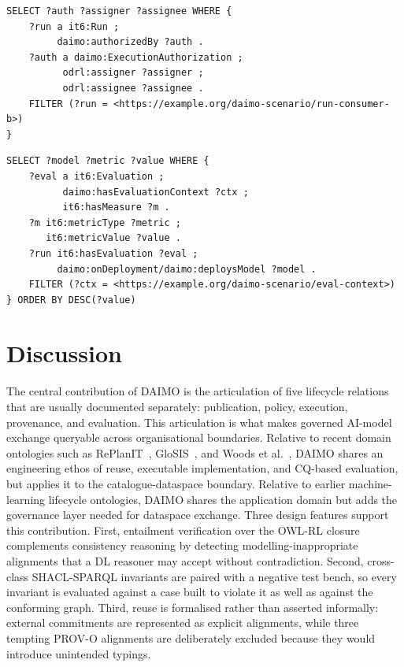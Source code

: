 \documentclass[11pt,a4paper]{article}
\begin{document}
\begin{lstlisting}[label=lst:cq-g3,caption={CQ-G3: authorisation and agreement for a specific run.}]
SELECT ?auth ?assigner ?assignee WHERE {
    ?run a it6:Run ;
         daimo:authorizedBy ?auth .
    ?auth a daimo:ExecutionAuthorization ;
          odrl:assigner ?assigner ;
          odrl:assignee ?assignee .
    FILTER (?run = <https://example.org/daimo-scenario/run-consumer-b>)
}
\end{lstlisting}

\begin{lstlisting}[label=lst:cq-v3,caption={CQ-V3: ranking of models under a shared evaluation context.}]
SELECT ?model ?metric ?value WHERE {
    ?eval a it6:Evaluation ;
          daimo:hasEvaluationContext ?ctx ;
          it6:hasMeasure ?m .
    ?m it6:metricType ?metric ;
       it6:metricValue ?value .
    ?run it6:hasEvaluation ?eval ;
         daimo:onDeployment/daimo:deploysModel ?model .
    FILTER (?ctx = <https://example.org/daimo-scenario/eval-context>)
} ORDER BY DESC(?value)
\end{lstlisting}


\section{Discussion}\label{sec:discussion}

The central contribution of DAIMO is the articulation of five lifecycle relations that are usually documented separately: publication, policy, execution, provenance, and evaluation. This articulation is what makes governed AI-model exchange queryable across organisational boundaries. Relative to recent domain ontologies such as RePlanIT~\cite{kurteva}, GloSIS~\cite{palma}, and Woods et al.~\cite{woods}, DAIMO shares an engineering ethos of reuse, executable implementation, and CQ-based evaluation, but applies it to the catalogue-dataspace boundary. Relative to earlier machine-learning lifecycle ontologies, DAIMO shares the application domain but adds the governance layer needed for dataspace exchange. Three design features support this contribution. First, entailment verification over the OWL-RL closure complements consistency reasoning by detecting modelling-inappropriate alignments that a DL reasoner may accept without contradiction. Second, cross-class SHACL-SPARQL invariants are paired with a negative test bench, so every invariant is evaluated against a case built to violate it as well as against the conforming graph. Third, reuse is formalised rather than asserted informally: external commitments are represented as explicit alignments, while three tempting PROV-O alignments are deliberately excluded because they would introduce unintended typings.
\end{document}
